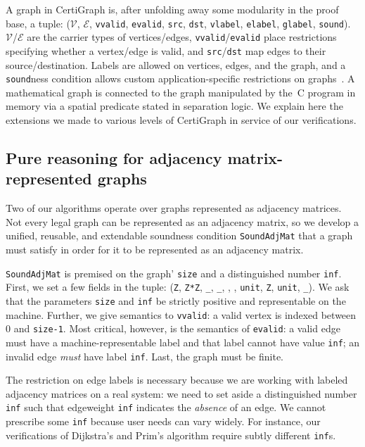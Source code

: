 
A graph in CertiGraph is, after unfolding away some modularity
in the proof base, a tuple: 
($\mathcal{V}$, $\mathcal{E}$, \texttt{vvalid}, \texttt{evalid}, 
\texttt{src}, \texttt{dst}, \texttt{vlabel}, \texttt{elabel}, \texttt{glabel}, 
\texttt{sound}). $\mathcal{V}$/$\mathcal{E}$ are the carrier 
types of vertices/edges, \texttt{vvalid}/\texttt{evalid}
place restrictions specifying whether a vertex/edge is valid, and
\texttt{src}/\texttt{dst} map edges to their source/destination.
Labels are allowed on vertices, edges, and the graph, and 
a \texttt{sound}ness condition allows custom application-specific 
restrictions on graphs~\cite{DBLP:journals/pacmpl/WangCMH19}. 
A mathematical graph is connected to the graph manipulated 
by the~C program in memory via a spatial predicate stated in separation logic.
We explain here the extensions we made to various levels of 
CertiGraph in service of our verifications.

\subsection{Pure reasoning for adjacency matrix-represented graphs}

Two of our algorithms operate over graphs represented as adjacency matrices.
Not every legal graph can be represented as an adjacency matrix, 
so we develop a unified, reusable, and extendable soundness condition
\texttt{SoundAdjMat} that a graph must satisfy in order for it 
to be represented as an adjacency matrix.

\texttt{SoundAdjMat} is premised on the graph' \texttt{size}
and a distinguished number \texttt{inf}.
First, we set a few
fields in the tuple: 
(\texttt{Z}, \texttt{Z*Z}, \texttt{\_}, \texttt{\_}, , , \texttt{unit}, \texttt{Z}, \texttt{unit}, \texttt{\_}).
We ask that the parameters \texttt{size} and \texttt{inf} be
strictly positive and representable on the machine. 
Further, we give semantics to \texttt{vvalid}: a valid vertex is indexed 
between $0$ and \texttt{size-1}.
Most critical, however, is the semantics of \texttt{evalid}:
a valid edge must have a machine-representable label and that label
cannot have value \texttt{inf}; an invalid edge \emph{must} have label \texttt{inf}.
Last, the graph must be finite.

The restriction on edge labels is necessary because we are working 
with labeled adjacency matrices on a real system: we need to set aside
a distinguished number \texttt{inf} such that edgeweight \texttt{inf}
indicates the \emph{absence} of an edge. We cannot
prescribe some \texttt{inf} because user needs can vary widely. For 
instance, our verifications of Dijkstra's and Prim's algorithm 
require subtly different \texttt{inf}s.

